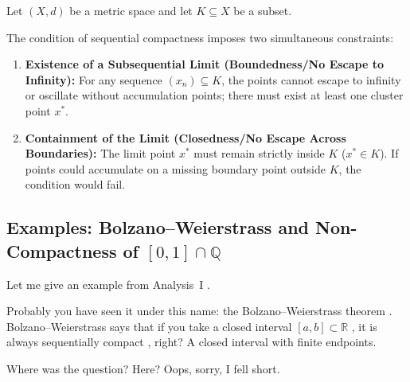 \begin{content}
Let $(X, d)$ be a metric space and let $K \subseteq X$ be a subset.


\begin{steps}
The condition of sequential compactness imposes two simultaneous constraints:
\begin{enumerate}[label=\textbf{(\arabic*)}]
    \setcounter{enumi}{0}
    \item \textbf{Existence of a Subsequential Limit (Boundedness/No Escape to Infinity):} For any sequence $(x_n) \subseteq K$, the points cannot escape to infinity or oscillate without accumulation points; there must exist at least one cluster point $x^*$.
    \item \textbf{Containment of the Limit (Closedness/No Escape Across Boundaries):} The limit point $x^*$ must remain strictly inside $K$ ($x^* \in K$). If points could accumulate on a missing boundary point outside $K$, the condition would fail.
\end{enumerate}
\end{steps}
\end{content}

\subsection{Examples: Bolzano--Weierstrass and Non-Compactness of \texorpdfstring{$[0, 1] \cap \mathbb{Q}$}{[0, 1] cap Q}}

\begin{speech}[00:56:12 - 00:57:26]
Let me give an example from Analysis~I .

Probably you have seen it under this name: the Bolzano--Weierstrass theorem . Bolzano--Weierstrass says that if you take a closed interval $[a, b] \subset \mathbb{R}$ , it is always sequentially compact , right? A closed interval with finite endpoints.

Where was the question? Here?  Oops, sorry, I fell short.
\end{speech}

